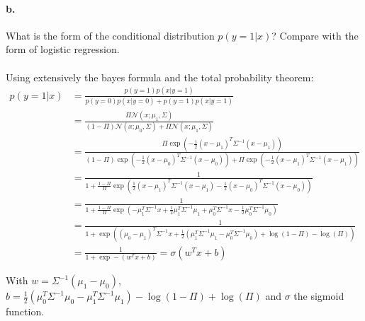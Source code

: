 \documentclass{article}
\begin{document}
\paragraph{b.} What is the form of the conditional distribution $p(y = 1|x)$? Compare with the form of logistic regression.\\
\vspace{10px}\\
Using extensively the bayes formula and the total probability theorem:
\begin{equation*}
    \begin{aligned}
        p(y=1|x) & = \frac{p(y=1)p(x|y=1)}{p(y=0)p(x|y=0) + p(y=1)p(x|y=1)}                                                                                                                                                                         \\
                 & = \frac{\Pi \mathcal{N}(x; \mu_1, \Sigma)}{(1- \Pi)\mathcal{N}(x; \mu_0, \Sigma) + \Pi \mathcal{N}(x; \mu_1, \Sigma)}                                                                                                            \\
                 & = \frac{\Pi \exp\left(-\frac{1}{2}(x - \mu_1)^T\Sigma^{-1}(x - \mu_1)\right)}{(1 - \Pi) \exp\left(-\frac{1}{2}(x - \mu_0)^T\Sigma^{-1}(x - \mu_0)\right) + \Pi \exp\left(-\frac{1}{2}(x - \mu_1)^T\Sigma^{-1}(x - \mu_1)\right)} \\
                 & = \frac{1}{1 + \frac{1 - \Pi}{\Pi} \exp\left(\frac{1}{2}(x - \mu_1)^T\Sigma^{-1}(x - \mu_1) - \frac{1}{2}(x - \mu_0)^T\Sigma^{-1}(x - \mu_0)\right) }                                                                            \\
                 & = \frac{1}{1 + \frac{1 - \Pi}{\Pi}\exp\left(-\mu_1^T\Sigma^{-1}x + \frac{1}{2}\mu_1^T\Sigma^{-1}\mu_1 + \mu_0^T\Sigma^{-1}x - \frac{1}{2}\mu_0^T\Sigma^{-1}\mu_0\right) }                                                        \\
                 & = \frac{1}{1 + \exp\left((\mu_0-\mu_1)^T\Sigma^{-1}x + \frac{1}{2}(\mu_1^T\Sigma^{-1}\mu_1 - \mu_0^T\Sigma^{-1}\mu_0) + \log(1-\Pi) - \log(\Pi)\right) }                                                                         \\
                 & \boxed{= \frac{1}{1 + \exp-(w^Tx + b) } = \sigma(w^Tx + b)}
    \end{aligned}
\end{equation*}

With $w = \Sigma^{-1}(\mu_1 - \mu_0)$, $b = \frac{1}{2}(\mu_0^T\Sigma^{-1}\mu_0 - \mu_1^T\Sigma^{-1}\mu_1) - \log(1-\Pi) + \log(\Pi)$ and $\sigma$ the sigmoid function.
\end{document}
